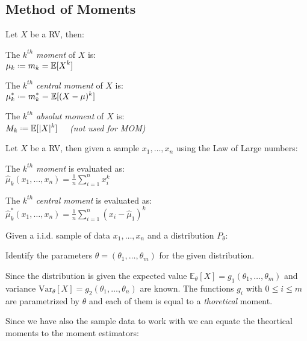 \documentclass[8pt,a4paper]{extarticle}     %
\newcommand{\eqdef}{\mathrel{\vcenter{\baselineskip0.5ex\lineskiplimit0pt\hbox{\scriptsize.}\hbox{\scriptsize.}}}=}
\newcommand{\Var}{\mathrm{Var}}
\begin{document}
\begin{multicols}{4}
\subsection{Method of Moments}
\begin{boxdefinition} 
	Let $X$ be a RV, then: 
	\begin{listnr}
		\item The \textit{$k^{th}$ moment} of $X$ is:\\ $\displaystyle\mu_k \eqdef m_k = \mathbb{E}[X^k]$	
		\item The \textit{$k^{th}$ central moment} of $X$ is: \\ $\displaystyle\mu_k^* \eqdef m_k^* = \mathbb{E}[(X-\mu)^k]$ 
		\item The \textit{$k^{th}$ absolut moment} of $X$ is: \\ $\displaystyle M_k\eqdef \mathbb{E}[|X|^k] \quad$ \textit{(not used for MOM)}
	\end{listnr} 
\end{boxdefinition}
\begin{boxdefinition} 
	Let $X$ be a RV, then given a sample $x_1,\dots,x_n$ using the Law of Large numbers: 
	\begin{listnr}
		\item The \textit{$k^{th}$ moment} is evaluated as: \\
		$\displaystyle\hat{\mu}_k(x_1,\dots,x_n) =\frac{1}{n}\sum_{i=1}^{n}x_i^k$
		\item The $k^{th}$ \textit{central moment} is evaluated as:\\ 
		$\displaystyle\hat{\mu}_k^*(x_1,\dots,x_n) = \frac{1}{n}\sum_{i=1}^{n}(x_i-\hat{\mu}_1)^k $
	\end{listnr}
\end{boxdefinition}
\begin{boxguide}[Evaluation] 
	Given a i.i.d. sample of data $x_1,\dots,x_n$ and a distribution $P_\theta$: 
	\begin{listnr}
		\item Identify the parameters $\theta=(\theta_1,\dots,\theta_m)$ for the given distribution. 
		\item Since the distribution is given the expected value $\mathbb{E}_\theta\left[X\right]=g_1(\theta_1,\dots,\theta_m)$ and variance $\Var_\theta\left[X\right]=g_2(\theta_1,\dots,\theta_n)$ are known. The functions $g_i$ with $0\leq i\leq m$ are parametrized by $\theta$ and each of them is equal to a \textit{thoretical} moment. 
		\item Since we have also the sample data to work with we can equate the theortical moments to the moment estimators:

\end{listnr}
\end{boxguide}
\end{multicols}
\end{document}

